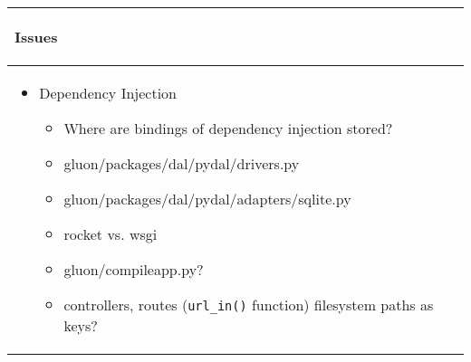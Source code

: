 \documentclass{article}
\begin{document}
\begin{longtable}{|p{\textwidth}|}
\hline
\rowcolor{background}
\begin{center}
\vspace{-1.5em}\textbf{Issues}\vspace{-1em}
\end{center} \\
\hline
\endhead
\begin{itemize}
    \item Dependency Injection
    \begin{itemize}
        \item Where are bindings of dependency injection stored?
        \item gluon/packages/dal/pydal/drivers.py
        \item gluon/packages/dal/pydal/adapters/sqlite.py
        \item rocket vs. wsgi
        \item gluon/compileapp.py?
        \item controllers, routes (\texttt{url\_in()} function) filesystem paths as keys?
    \end{itemize}
    \begin{center}
    \end{center}
\end{itemize}\\
\hline
\end{longtable}
\end{document}
